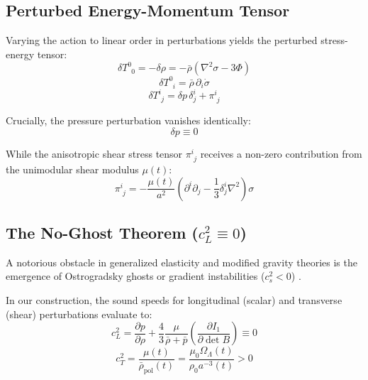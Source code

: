 \documentclass[10pt,twocolumn]{article}
\begin{document}
\subsection{Perturbed Energy-Momentum Tensor}

Varying the action to linear order in perturbations yields the perturbed stress-energy tensor:
\begin{equation}
  \delta T^0_{\phantom{0}0} = -\delta \rho = -\bar{\rho} \left( \nabla^2 \sigma - 3\Phi \right)
\end{equation}
\begin{equation}
  \delta T^0_{\phantom{0}i} = \bar{\rho} \, \partial_i \dot{\sigma}
\end{equation}
\begin{equation}
  \delta T^i_{\phantom{i}j} = \delta p \, \delta^i_j + \pi^i_{\phantom{i}j}
\end{equation}

Crucially, the pressure perturbation vanishes identically:
\begin{equation}
  \delta p \equiv 0
\end{equation}

While the anisotropic shear stress tensor $\pi^i_{\phantom{i}j}$ receives a non-zero contribution from the unimodular shear modulus $\mu(t)$:
\begin{equation}
  \pi^i_{\phantom{i}j} = -\frac{\mu(t)}{a^2} \left( \partial^i \partial_j - \frac{1}{3} \delta^i_j \nabla^2 \right) \sigma
\end{equation}


\subsection{The No-Ghost Theorem ($c_L^2 \equiv 0$)}

A notorious obstacle in generalized elasticity and modified gravity theories is the emergence of Ostrogradsky ghosts or gradient instabilities ($c_s^2 < 0$) \cite{Dubovsky2006}. 

In our construction, the sound speeds for longitudinal (scalar) and transverse (shear) perturbations evaluate to:
\begin{equation}
  c_L^2 = \frac{\partial p}{\partial \rho} + \frac{4}{3} \frac{\mu}{\bar{\rho} + \bar{p}} \left( \frac{\partial I_1}{\partial \det B} \right) \equiv 0
\end{equation}
\begin{equation}
  c_T^2 = \frac{\mu(t)}{\bar{\rho}_{\text{pol}}(t)} = \frac{\mu_0 \Omega_\Lambda(t)}{\rho_0 a^{-3}(t)} > 0
\end{equation}
\end{document}
